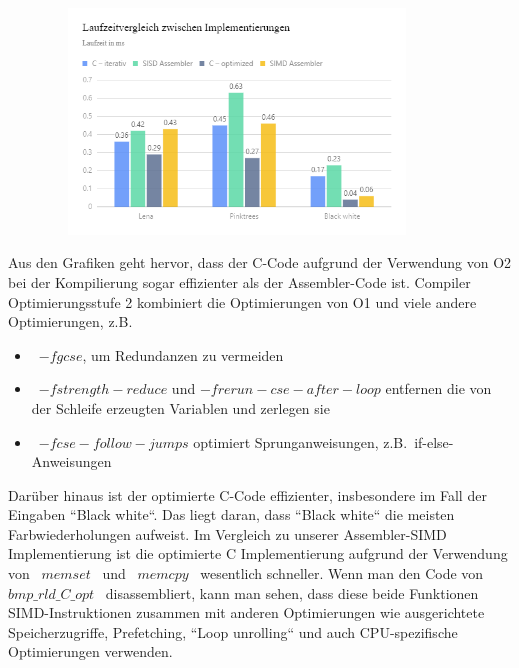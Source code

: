 \documentclass[course=erap]{aspdoc}
\begin{document}
    \begin{figure}[htbp]
        \begin{minipage}[t]{\textwidth}
            \centering
            \includegraphics[height=6cm, width=10cm]{diagram/togather_time}
        \end{minipage}\label{fig:figure6}
        \noindent
    \end{figure}
    \noindent Aus den Grafiken geht hervor, dass der C-Code aufgrund der Verwendung von O2 bei der Kompilierung sogar
    effizienter als der Assembler-Code ist.
    Compiler Optimierungsstufe 2 kombiniert die Optimierungen von O1 und viele andere Optimierungen,
    z.B\@.
    \begin{itemize}
        \item \ $-fgcse$, um Redundanzen zu vermeiden
        \item \ $-fstrength-reduce$ und $-frerun-cse-after-loop$ entfernen die von der Schleife
        erzeugten Variablen und zerlegen sie
        \item \ $-fcse-follow-jumps$ optimiert Sprunganweisungen, z.B.\ if-else-Anweisungen
    \end{itemize}
    \noindent Darüber hinaus ist der optimierte C-Code effizienter, insbesondere im Fall der Eingaben ``Black white``.
    Das liegt daran, dass ``Black white`` die meisten Farbwiederholungen aufweist.
    \newline
    \newline
    Im Vergleich zu unserer Assembler-SIMD Implementierung ist die optimierte C Implementierung aufgrund der
    Verwendung von \ $memset$ \ und \ $memcpy$ \ wesentlich schneller.
    Wenn man den Code von \ $bmp\_rld\_C\_opt$ \ disassembliert, kann man sehen, dass diese beide Funktionen
    SIMD-Instruktionen zusammen mit anderen Optimierungen wie ausgerichtete Speicherzugriffe, Prefetching,
    ``Loop unrolling`` und auch CPU-spezifische Optimierungen verwenden.
    \newline
\end{document}
